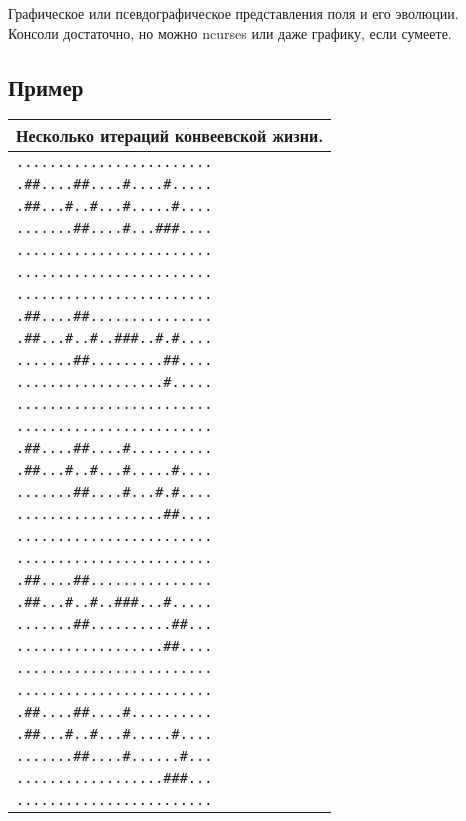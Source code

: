 \documentclass[12pt, oneside]{article}
\begin{document}
Графическое или псевдографическое представления поля и его эволюции. Консоли достаточно, но можно ncurses или даже графику, если сумеете.

\subsection*{Пример}
\begin{tabular}{| p{} |}
\hline
Несколько итераций конвеевской жизни.\\
\hline
\verb'........................'\\
\verb'.##....##....#....#.....'\\
\verb'.##...#..#...#.....#....'\\
\verb'.......##....#...###....'\\
\verb'........................'\\
\verb'........................'\\
\hline
\verb'........................'\\
\verb'.##....##...............'\\
\verb'.##...#..#..###..#.#....'\\
\verb'.......##.........##....'\\
\verb'..................#.....'\\
\verb'........................'\\
\hline
\verb'........................'\\
\verb'.##....##....#..........'\\
\verb'.##...#..#...#.....#....'\\
\verb'.......##....#...#.#....'\\
\verb'..................##....'\\
\verb'........................'\\
\hline
\verb'........................'\\
\verb'.##....##...............'\\
\verb'.##...#..#..###...#.....'\\
\verb'.......##..........##...'\\
\verb'..................##....'\\
\verb'........................'\\
\hline
\verb'........................'\\
\verb'.##....##....#..........'\\
\verb'.##...#..#...#.....#....'\\
\verb'.......##....#......#...'\\
\verb'..................###...'\\
\verb'........................'\\
\hline
\end{tabular}
\end{document}
